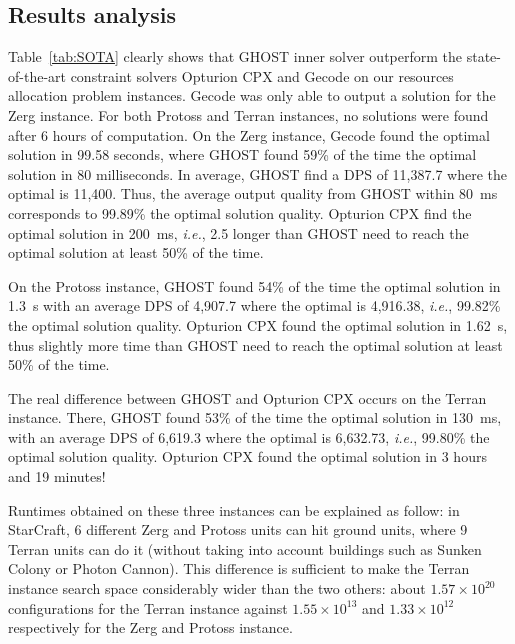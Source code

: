 \documentclass[journal]{IEEEtran}
\newcommand{\ghost}{\textsc{GHOST}\xspace}
\newcommand{\ie}{\textit{i.e.}}
\begin{document}
{\subsection{Results analysis}

Table~\ref{tab:SOTA} clearly shows that \ghost inner solver outperform
the state-of-the-art constraint solvers Opturion CPX and Gecode on our
resources allocation problem instances. Gecode was only able to output
a  solution  for  the  Zerg  instance. For  both  Protoss  and  Terran
instances, no  solutions were found  after 6 hours of  computation. On
the Zerg instance, Gecode found the optimal solution in 99.58 seconds,
where  \ghost found  59\%  of  the time  the  optimal  solution in  80
milliseconds.  In  average, \ghost  find a DPS  of 11,387.7  where the
optimal is 11,400. Thus, the average output quality from \ghost within
80~ms corresponds to 99.89\% the optimal solution quality. Opturion CPX
find  the optimal  solution  in  200~ms, \ie,  2.5  longer than  \ghost
need to reach the optimal solution at least 50\% of the time.

On the  Protoss instance, \ghost  found 54\%  of the time  the optimal
solution  in 1.3~s with  an average  DPS of  4,907.7 where  the
optimal   is    4,916.38,   \ie,   99.82\%   the    optimal   solution
quality.  Opturion  CPX  found  the optimal  solution  in  1.62~s,  thus
slightly more time  than \ghost need to reach the  optimal solution at
least 50\% of the time.

The  real difference  between \ghost  and Opturion  CPX occurs  on the
Terran  instance. There,  \ghost found  53\% of  the time  the optimal
solution in 130~ms, with an average DPS of 6,619.3 where the
optimal  is  6,632.73,  \ie,  99.80\% the  optimal  solution  quality.
Opturion CPX found the optimal solution in 3 hours and 19 minutes!

Runtimes obtained on these three instances can be explained as follow:
in StarCraft, 6 different Zerg and Protoss units can hit ground units,
where 9 Terran units can do  it (without taking into account buildings
such  as  Sunken  Colony  or   Photon  Cannon).   This  difference  is
sufficient to make the Terran instance search space considerably wider
than the  two others: about  $1.57 \times 10^{20}$  configurations for
the Terran  instance against  $1.55 \times  10^{13}$ and  $1.33 \times
10^{12}$ respectively for the Zerg and Protoss instance.

}
\end{document}
